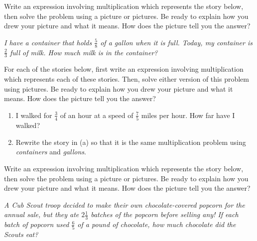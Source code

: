 \documentclass{ximera}
\begin{document}




\begin{problem}
 Write an expression involving multiplication which represents the story below, then solve the problem using a picture or pictures.  Be ready to explain how you drew your picture and what it means.  How does the picture tell you the answer?

\emph{I have a container that holds $\frac{5}{8}$ of a gallon when it is full.  Today, my container is $\frac{2}{3}$ full of milk. How much milk is in the container?}
\end{problem}

\begin{problem}
 For each of the stories below, first write an expression involving multiplication which represents each of these stories.  Then, solve either version of this problem using pictures.  Be ready to explain how you drew your picture and what it means.  How does the picture tell you the answer? 

\begin{enumerate}
    \item I walked for  $\frac{3}{4}$ of an hour at a speed of  $\frac{7}{5}$ miles per hour.  How far have I walked?
    \item Rewrite the story in (a) so that it is the same multiplication problem using \emph{containers} and \emph{gallons}.
\end{enumerate}
\end{problem}


\begin{problem}
 Write an expression involving multiplication which represents the story below, then solve the problem using a picture or pictures.  Be ready to explain how you drew your picture and what it means.  How does the picture tell you the answer?


\emph{A Cub Scout troop decided to make their own chocolate-covered popcorn for the annual sale, but they ate $2 \frac{1}{3}$ batches of the popcorn before selling any! If each batch of popcorn used $\frac{6}{5}$ of a pound of chocolate, how much chocolate did the Scouts eat?}

\end{problem}

 
\end{document}

